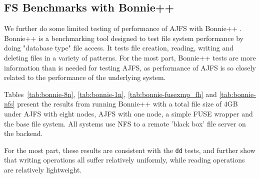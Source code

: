 \subsection{FS Benchmarks with Bonnie++}

We further do some limited testing of performance of AJFS with Bonnie++
\cite{bonnie++}. Bonnie++ is a benchmarking tool designed to test file system
performance by doing "database type" file access. It tests file creation,
reading, writing and deleting files in a variety of patterns. For the most part,
Bonnie++ tests are more information than is needed for testing AJFS, as
performance of AJFS is so closely related to the performance of the underlying
system.

Tables~\ref{tab:bonnie-8n}, \ref{tab:bonnie-1n},
\ref{tab:bonnie-fusexmp_fh} and \ref{tab:bonnie-nfs} present the results
from running Bonnie++ with a total file size of 4GB under AJFS with eight nodes,
AJFS with one node, a simple FUSE wrapper and the base file system. All systems
use NFS to a remote 'black box' file server on the backend.

For the most part, these results%
are consistent with the \texttt{dd} tests, and further show that writing
operations all suffer relatively uniformly, while reading operations are
relatively lightweight.

